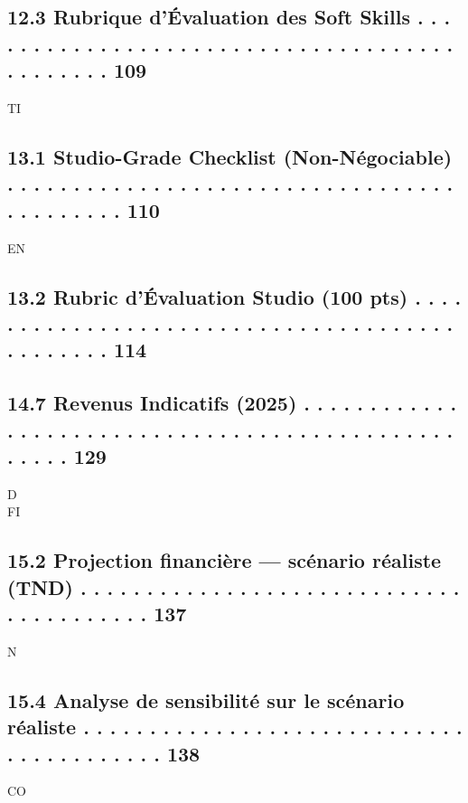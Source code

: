 \documentclass[12pt,landscape,a4paper]{article}
\begin{document}
\subsection{12.3 Rubrique d’Évaluation des Soft Skills . . . . . . . . . . . . . . . . . . . . . . . . . . . . . . . . . . . . . . . . . . . . . 109}
\vspace{0.5em}
\vspace{0.5em}
\vspace{0.5em}
\vspace{0.5em}
TI\\
\subsection{13.1 Studio-Grade Checklist (Non-Négociable) . . . . . . . . . . . . . . . . . . . . . . . . . . . . . . . . . . . . . . . . . . . 110}
\vspace{0.5em}
\vspace{0.5em}
\vspace{0.5em}
\vspace{0.5em}
EN\\
\subsection{13.2 Rubric d’Évaluation Studio (100 pts) . . . . . . . . . . . . . . . . . . . . . . . . . . . . . . . . . . . . . . . . . . . . . . 114}
\vspace{0.5em}
\subsection{14.7 Revenus Indicatifs (2025)      . . . . . . . . . . . . . . . . . . . . . . . . . . . . . . . . . . . . . . . . . . . . . . . . . . . 129}
\vspace{0.5em}
\vspace{0.5em}
\vspace{0.5em}
\vspace{0.5em}
D\\
FI\\
\subsection{15.2 Projection financière — scénario réaliste (TND) . . . . . . . . . . . . . . . . . . . . . . . . . . . . . . . . . . . . . . . . 137}
\vspace{0.5em}
N\\
\subsection{15.4 Analyse de sensibilité sur le scénario réaliste . . . . . . . . . . . . . . . . . . . . . . . . . . . . . . . . . . . . . . . . . 138}
CO\\
\end{document}
